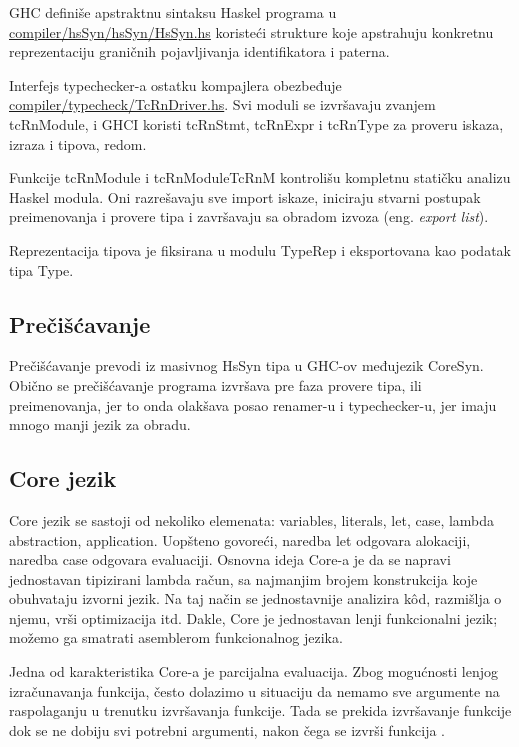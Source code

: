 GHC definiše apstraktnu sintaksu Haskel programa u \\ \underline{compiler/hsSyn/hsSyn/HsSyn.hs}  koristeći strukture koje apstrahuju konkretnu reprezentaciju graničnih pojavljivanja identifikatora i paterna.

Interfejs typechecker-a ostatku kompajlera obezbeđuje \\ \underline{compiler/typecheck/TcRnDriver.hs}. Svi moduli se izvršavaju zvanjem tcRnModule, i GHCI koristi tcRnStmt, tcRnExpr 
i tcRnType za proveru iskaza, izraza i tipova, redom.

Funkcije tcRnModule i tcRnModuleTcRnM kontrolišu kompletnu statičku analizu Haskel modula. Oni razrešavaju sve import iskaze, iniciraju stvarni postupak preimenovanja i provere tipa i završavaju sa obradom izvoza (eng. \emph{export list}).

Reprezentacija tipova je fiksirana u modulu TypeRep i eksportovana kao podatak tipa Type.

\subsection{Prečišćavanje}
\label{subsec:podnaslovDesugar}

Prečišćavanje prevodi iz masivnog HsSyn tipa u GHC-ov međujezik CoreSyn. Obično se prečišćavanje programa izvršava pre faza provere tipa, ili preimenovanja, jer to onda olakšava posao renamer-u i typechecker-u, jer imaju mnogo manji jezik za obradu.

\subsection{Core jezik}
\label{subsec:podnaslovCore}

Core jezik se sastoji od nekoliko elemenata: variables, literals, let, case, lambda abstraction, application. 
Uopšteno govoreći, naredba let odgovara alokaciji, naredba case odgovara evaluaciji.
Osnovna ideja Core-a je da se napravi jednostavan tipizirani lambda račun, sa najmanjim brojem konstrukcija koje obuhvataju izvorni jezik. Na taj način se jednostavnije analizira k\^{o}d, razmišlja o njemu, vrši optimizacija itd.
Dakle, Core je jednostavan lenji funkcionalni jezik; možemo ga smatrati asemblerom funkcionalnog jezika.

Jedna od karakteristika Core-a je parcijalna evaluacija. Zbog mogućnosti lenjog izračunavanja funkcija, često dolazimo u situaciju da nemamo sve argumente na raspolaganju u trenutku izvršavanja funkcije. Tada se prekida izvršavanje funkcije dok se ne dobiju svi potrebni argumenti, nakon čega se izvrši funkcija \cite{Launchbury}. 